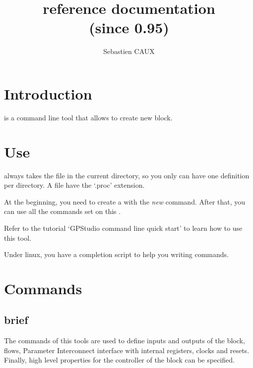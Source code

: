 \documentclass[10pt,a4paper]{article}
\author{Sebastien CAUX}
\title{\tool{} reference documentation \version \\ (since 0.95)}
\begin{document}
\maketitle
\section{Introduction}
\tool{} is a command line tool that allows to create new \kind{} block.

\section{Use}
\tool{} always takes the \kind{} file in the current directory, so you only can have one \kind{} definition per directory. A \kind{} file have the `.proc' extension.

At the beginning, you need to create a \kind{} with the \emph{new} command. After that, you can use all the commands set on this \kind{}.

Refer to the tutorial `GPStudio command line quick start' to learn how to use this tool.

Under linux, you have a completion script to help you writing commands.

\section{Commands}
\subsection{brief}
The commands of this tools are used to define inputs and outputs of the block, flows, Parameter Interconnect interface with internal registers, clocks and resets. Finally, high level properties for the controller of the block can be specified.
\end{document}

